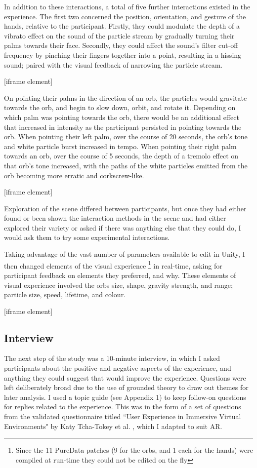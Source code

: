 In addition to these interactions, a total of five further interactions existed in the experience. The first two concerned the position, orientation, and gesture of the hands, relative to the participant. Firstly, they could modulate the depth of a vibrato effect on the sound of the particle stream by gradually turning their palms towards their face. Secondly, they could affect the sound’s filter cut-off frequency by pinching their fingers together into a point, resulting in a hissing sound; paired with the visual feedback of narrowing the particle stream.

[iframe element]

On pointing their palms in the direction of an orb, the particles would gravitate towards the orb, and begin to slow down, orbit, and rotate it. Depending on which palm was pointing towards the orb, there would be an additional effect that increased in intensity as the participant persisted in pointing towards the orb. When pointing their left palm, over the course of 20 seconds, the orb’s tone and white particle burst increased in tempo. When pointing their right palm towards an orb, over the course of 5 seconds, the depth of a tremolo effect on that orb’s tone increased, with the paths of the white particles emitted from the orb becoming more erratic and corkscrew-like.

[iframe element]

Exploration of the scene differed between participants, but once they had either found or been shown the interaction methods in the scene and had either explored their variety or asked if there was anything else that they could do, I would ask them to try some experimental interactions.

Taking advantage of the vast number of parameters available to edit in Unity, I then changed elements of the visual   experience \footnote{Since the 11 PureData patches (9 for the orbs, and 1 each for the hands) were compiled at run-time they could not be edited on the fly} in real-time, asking for participant feedback on elements they preferred, and why. These elements of visual experience involved the orbs size, shape, gravity strength, and range; particle size, speed, lifetime, and colour.

[iframe element]

\subsection{Interview}\label{sec: polaris-study-interview}
The next step of the study was a 10-minute interview, in which I asked participants about the positive and negative aspects of the experience, and anything they could suggest that would improve the experience. Questions were left deliberately broad due to the use of grounded theory to draw out themes for later analysis. I used a topic guide (see Appendix 1) to keep follow-on questions for replies related to the experience. This was in the form of a set of questions from the validated questionnaire titled ``User Experience in Immersive Virtual Environments" by Katy Tcha-Tokey et al. \citeyearpar{tcha-tokey2016a}, which I adapted to suit AR.

